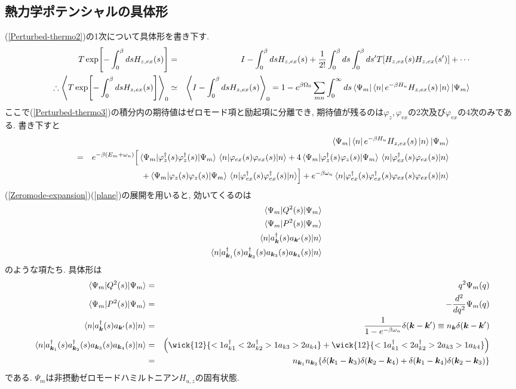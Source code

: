\documentclass[10.5pt,a4paper]{jreport}
\newcommand{\bk}{\bm{k}}
\begin{document}
\subsection{熱力学ポテンシャルの具体形}
(\ref{Perturbed-thermo2})の1次について具体形を書き下す. 
\begin{eqnarray}
\nonumber  T\exp[-\int_0^\beta ds H_{z, ex}(s)] &=& I -\int_0^{\beta}ds H_{z, ex}(s) + \frac{1}{2!}\int_0^\beta ds\int_0^\beta ds' T\qty[H_{z, ex}(s)H_{z, ex}(s')] + \cdots\\
\nonumber  \therefore \ev{T\exp[-\int_0^\beta ds H_{z, ex}(s)]}_0 &\simeq& \ev{I -\int_0^{\beta}ds H_{z, ex}(s)}_0 = 1 - e^{\beta\Omega_0}\sum_{mn}\int_0^\infty ds\bra{\Psi_m}\bra{n}e^{-\beta H_u}H_{z, ex}(s)\ket{n}\ket{\Psi_m}\label{Perturbed-thermo3}\\
\end{eqnarray}
ここで(\ref{Perturbed-thermo3})の積分内の期待値はゼロモード項と励起項に分離でき, 期待値が残るのは$\varphi_z, \varphi_{ex}$の2次及び$\varphi_{ex}$の4次のみである. 書き下すと
\begin{eqnarray}
  \nonumber  &&\bra{\Psi_m}\bra{n}e^{-\beta H_u}H_{z, ex}(s)\ket{n}\ket{\Psi_m}\\
\nonumber  &=& e^{-\beta(E_m + \omega_n)}\Bigl[\ev{\varphi^\dagger_z(s)\varphi^\dagger_z(s)}{\Psi_m}\ev{\varphi_{ex}(s)\varphi_{ex}(s)}{n} + 4\ev{\varphi^\dagger_z(s)\varphi_z(s)}{\Psi_m}\ev{\varphi^\dagger_{ex}(s)\varphi_{ex}(s)}{n}\\
\nonumber  &&\hspace{2cm} + \ev{\varphi_z(s)\varphi_z(s)}{\Psi_m}\ev{\varphi^\dagger_{ex}(s)\varphi^\dagger_{ex}(s)}{n}\Bigr] + e^{-\beta\omega_n}\ev{\varphi^\dagger_{ex}(s)\varphi^\dagger_{ex}(s)\varphi_{ex}(s)\varphi_{ex}(s)}{n}\\
\end{eqnarray}
(\ref{Zeromode-expansion})(\ref{plane})の展開を用いると, 効いてくるのは
\begin{eqnarray}
  &&\ev{Q^2(s)}{\Psi_m}\\
  &&\ev{P^2(s)}{\Psi_m}\\
  &&\ev{a_{\bk}^\dagger(s) a_{\bk'}(s)}{n}\label{BdG-ev1}\\
  &&\ev{a_{\bk_1}^\dagger(s)a_{\bk_2}^\dagger(s) a_{\bk_3}(s)a_{\bk_4}(s)}{n}\label{BdG-ev2}
\end{eqnarray}
のような項たち. 具体形は
\begin{eqnarray}
  \ev{Q^2(s)}{\Psi_m} &=& q^2\Psi_m(q)\\
  \ev{P^2(s)}{\Psi_m} &=& -\frac{d^2}{dq^2}\Psi_m(q)\\
  \ev{a_{\bk}^\dagger(s) a_{\bk'}(s)}{n} &=& \frac{1}{1-e^{-\beta\omega_n}}\delta(\bk-\bk') \equiv n_{\bk}\delta(\bk - \bk')\\
\nonumber  \ev{a_{\bk_1}^\dagger(s)a_{\bk_2}^\dagger(s) a_{\bk_3}(s)a_{\bk_4}(s)}{n} &=& \qty(\wick{12}{<1a^\dagger_{k1}<2a^\dagger_{k2}>1a_{k3}>2a_{k4}} + \wick{12}{<1a^\dagger_{k1}<2a^\dagger_{k2}>2a_{k3}>1a_{k4}})\\
  &=& n_{\bk_1}n_{\bk_2}\qty{\delta(\bk_1 - \bk_3)\delta(\bk_2 - \bk_4) + \delta(\bk_1 - \bk_4)\delta(\bk_2 - \bk_3)}
\end{eqnarray}
である. $\Psi_m$は非摂動ゼロモードハミルトニアン$H_{u, z}$の固有状態.
\end{document}
